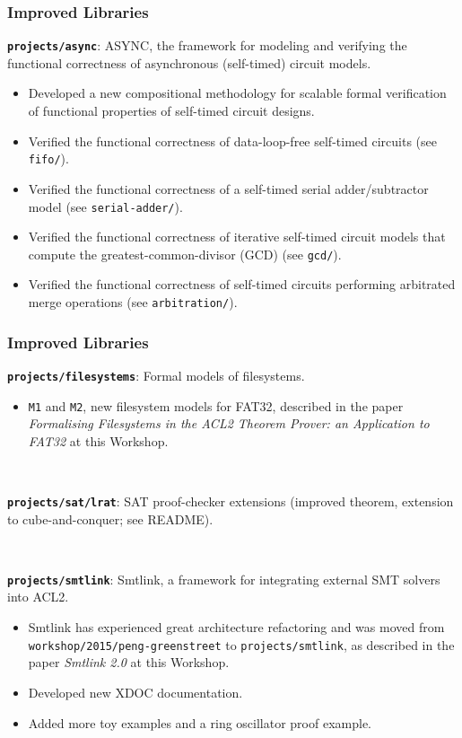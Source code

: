\documentclass{beamer}
\newcommand{\code}[1]{\texttt{#1}}
\newcommand{\bookpath}[1]{\textbf{\code{#1}}}
\newcommand{\implibtitle}{\frametitle{Improved Libraries}}
\begin{document}

\begin{frame}

\implibtitle

\bookpath{projects/async}:
ASYNC, the framework for modeling and verifying the functional correctness
of asynchronous (self-timed) circuit models.
\begin{itemize}
\item
Developed a new compositional methodology for scalable formal
verification of functional properties of self-timed circuit designs.
\item
Verified the functional correctness of data-loop-free self-timed
circuits (see \code{fifo/}).
\item
Verified the functional correctness of a self-timed serial
adder/subtractor model (see \code{serial-adder/}).
\item
Verified the functional correctness of iterative self-timed circuit
models that compute the greatest-common-divisor (GCD) (see \code{gcd/}).
\item
Verified the functional correctness of self-timed circuits performing
arbitrated merge operations (see \code{arbitration/}).
\end{itemize}

\end{frame}


\begin{frame}

\implibtitle

\bookpath{projects/filesystems}:
Formal models of filesystems.
\begin{itemize}
\item
\texttt{M1} and \texttt{M2}, new filesystem models for FAT32,
described in the paper
\textit{Formalising Filesystems in the ACL2 Theorem Prover:
an Application to FAT32}
at this Workshop.
\end{itemize}

\

\bookpath{projects/sat/lrat}:
SAT proof-checker extensions (improved theorem, extension to
cube-and-conquer; see README).

\

\bookpath{projects/smtlink}:
Smtlink, a framework for integrating external SMT solvers into ACL2.
\begin{itemize}
\item
Smtlink has experienced great architecture refactoring and was moved from
\code{workshop/2015/peng-greenstreet} to \code{projects/smtlink},
as described in the paper \textit{Smtlink 2.0} at this Workshop.
\item
Developed new XDOC documentation.
\item
Added more toy examples and a ring oscillator proof example.
\end{itemize}

\end{frame}
\end{document}
